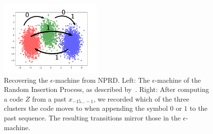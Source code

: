 \documentclass[entropy,article,submit,moreauthors,pdftex,10pt,a4paper]{Definitions/mdpi}
\begin{document}
\begin{figure}
\centering
{}
\includegraphics[width=0.45\textwidth]{code/figures/foo_pca_3_machine.png}
	\caption{Recovering the $\epsilon$-machine from NPRD. Left: The $\epsilon$-machine of the Random Insertion Process, as described by~\cite{marzen-predictive-2016}. Right: After computing a code $Z$ from a past $x_{-15\dots-1}$, we recorded which of the three clusters the code moves to when appending the symbol $0$ or $1$ to the past sequence. The resulting transitions mirror those in the $\epsilon$-machine. }\label{fig:rip-machine}
\end{figure}






\end{document}
